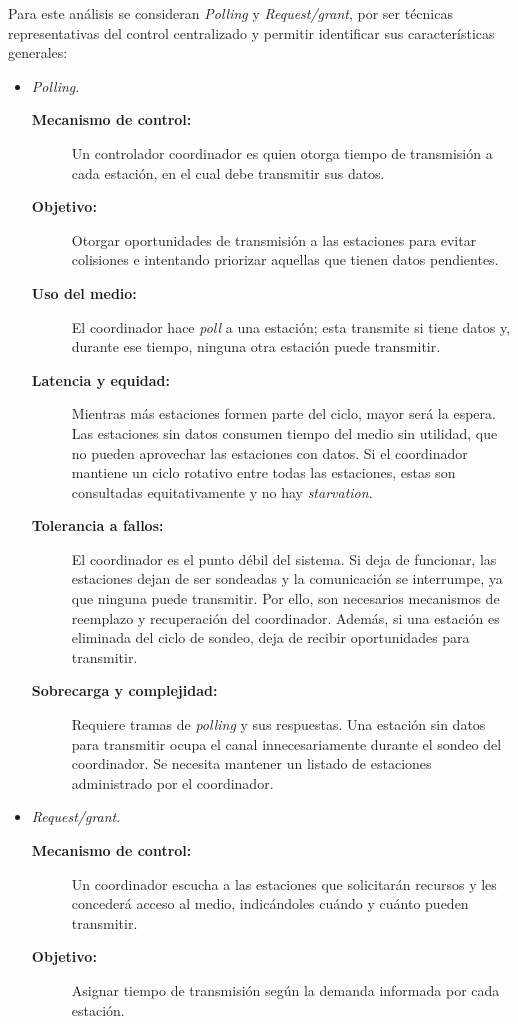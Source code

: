 \documentclass[11pt,a4paper]{article}
\begin{document}
Para este análisis se consideran \textit{Polling} y \textit{Request/grant}, por ser técnicas representativas del control centralizado y permitir identificar sus características generales:
\begin{itemize}
  \item \textit{Polling}.
  \begin{description}
    \item[\textbf{Mecanismo de control:}] Un controlador coordinador es quien otorga tiempo de transmisión a cada estación, en el cual debe transmitir sus datos.
    \item[\textbf{Objetivo:}] Otorgar oportunidades de transmisión a las estaciones para evitar colisiones e intentando priorizar aquellas que tienen datos pendientes.
    \item[\textbf{Uso del medio:}] El coordinador hace \textit{poll} a una estación; esta transmite si tiene datos y, durante ese tiempo, ninguna otra estación puede transmitir.
    \item[\textbf{Latencia y equidad:}] Mientras más estaciones formen parte del ciclo, mayor será la espera. Las estaciones sin datos consumen tiempo del medio sin utilidad, que no pueden aprovechar las estaciones con datos. Si el coordinador mantiene un ciclo rotativo entre todas las estaciones, estas son consultadas equitativamente y no hay \textit{starvation}.
    \item[\textbf{Tolerancia a fallos:}] El coordinador es el punto débil del sistema. Si deja de funcionar, las estaciones dejan de ser sondeadas y la comunicación se interrumpe, ya que ninguna puede transmitir. Por ello, son necesarios mecanismos de reemplazo y recuperación del coordinador. Además, si una estación es eliminada del ciclo de sondeo, deja de recibir oportunidades para transmitir.
    \item[\textbf{Sobrecarga y complejidad:}] Requiere tramas de \textit{polling} y sus respuestas. Una estación sin datos para transmitir ocupa el canal innecesariamente durante el sondeo del coordinador. Se necesita mantener un listado de estaciones administrado por el coordinador.
  \end{description}
  \item \textit{Request/grant}.
  \begin{description}
    \item[\textbf{Mecanismo de control:}] Un coordinador escucha a las estaciones que solicitarán recursos y les concederá acceso al medio, indicándoles cuándo y cuánto pueden transmitir.
    \item[\textbf{Objetivo:}] Asignar tiempo de transmisión según la demanda informada por cada estación.

\end{description}
\end{itemize}
\end{document}
